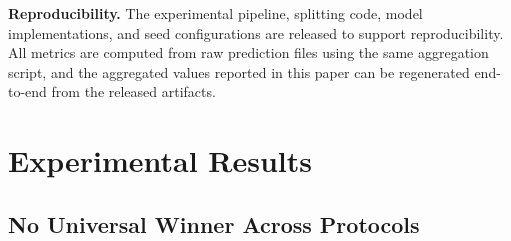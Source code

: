 \documentclass[journal]{IEEEtran}
\begin{document}
\textbf{Reproducibility.} The experimental pipeline, splitting code, model implementations, and seed configurations are released to support reproducibility. All metrics are computed from raw prediction files using the same aggregation script, and the aggregated values reported in this paper can be regenerated end-to-end from the released artifacts.

\FloatBarrier

\section{Experimental Results}
\label{sec:results}

\subsection{No Universal Winner Across Protocols}
\label{sec:overall}
\end{document}
